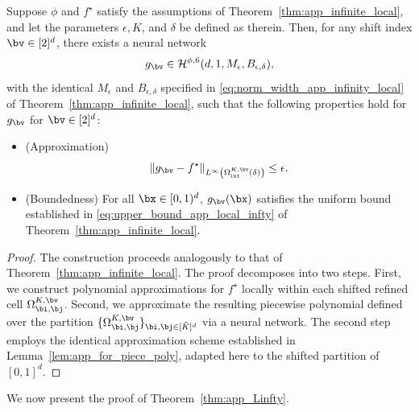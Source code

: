 \documentclass[11pt]{article}
\begin{document}
\begin{theorem}
    \label{thm:app_shifted}
    Suppose $\phi$ and $f^{\star}$ satisfy the assumptions of Theorem~\ref{thm:app_infinite_local}, and let the parameters $\epsilon, K$, and $\delta$ be defined as therein. Then, for any shift index $\bv \in [2]^d$, there exists a neural network
    \begin{equation*}
        g_{\bv} \in \mathcal{H}^{\phi,6} (d, 1, M_{\epsilon}, B_{\epsilon,\delta}),
    \end{equation*}
    with the identical $M_{\epsilon}$ and $B_{\epsilon,\delta}$ specified in \eqref{eq:norm_width_app_infinity_local} of Theorem~\ref{thm:app_infinite_local}, such that the following properties hold for $g_{\bv}$ for $\bv \in [2]^d$:
    \begin{itemize}
        \item (Approximation) \[
        \|g_{\bv} - f^{\star}\|_{L^\infty\left( \Omega_{\mathrm{int}}^{K, \bv}(\delta)\right)} \le \epsilon.
        \]
        \item (Boundedness) For all $\bx \in [0,1)^d$, $g_{\bv}(\bx)$ satisfies the uniform bound established in \eqref{eq:upper_bound_app_local_infty} of Theorem~\ref{thm:app_infinite_local}.
    \end{itemize}
\end{theorem}
\begin{proof}
    The construction proceeds analogously to that of Theorem~\ref{thm:app_infinite_local}. The proof decomposes into two steps. First, we construct polynomial approximations for $f^{\star}$ locally within each shifted refined cell $\Omega_{\bi, \bj}^{K,\bv}$. Second, we approximate the resulting piecewise polynomial defined over the partition $\{\Omega_{\bi, \bj}^{K,\bv}\}_{\bi,\bj \in [\tilde{K}]^d}$ via a neural network. The second step employs the identical approximation scheme established in Lemma~\ref{lem:app_for_piece_poly}, adapted here to the shifted partition of $[0,1]^d$.
\end{proof}

We now present the proof of Theorem~\ref{thm:app_Linfty}.
\end{document}
